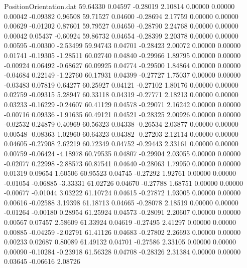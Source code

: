 \begin{filecontents}{PositionOrientation.dat}
  59.64330    0.04597   -0.28019     2.10814    0.00000    0.00000    0.00042   -0.09382    0.96508
  59.71527    0.04600   -0.28694     2.17759    0.00000    0.00000    0.00629   -0.01202    0.87601
  59.79527    0.04650   -0.28790     2.24768    0.00000    0.00000    0.00042    0.05437   -0.60924
  59.86732    0.04654   -0.28399     2.20378    0.00000    0.00000    0.00595   -0.00300   -2.53499
  59.94743    0.04701   -0.28423     2.00072    0.00000    0.00000    0.01741   -0.19305   -1.28511
  60.02740    0.04840   -0.29966     1.89795    0.00000    0.00000   -0.00924    0.06492   -0.68627
  60.09925    0.04774   -0.29500     1.84864    0.00000    0.00000   -0.04684    0.22149   -1.22760
  60.17931    0.04399   -0.27727     1.75037    0.00000    0.00000   -0.03483    0.07819    0.64277
  60.25927    0.04121   -0.27102     1.80176    0.00000    0.00000    0.02759   -0.09315    5.28947
  60.33118    0.04319   -0.27771     2.18213    0.00000    0.00000    0.03233   -0.16229   -0.24607
  60.41129    0.04578   -0.29071     2.16242    0.00000    0.00000   -0.00716    0.09336   -1.91635
  60.49121    0.04521   -0.28325     2.00926    0.00000    0.00000   -0.02532    0.24879    0.40969
  60.56323    0.04338   -0.26534     2.03877    0.00000    0.00000    0.00548   -0.08363    1.02960
  60.64323    0.04382   -0.27203     2.12114    0.00000    0.00000    0.04605   -0.27908    2.62219
  60.72349    0.04752   -0.29443     2.33161    0.00000    0.00000    0.00759   -0.06424   -4.18978
  60.79535    0.04807   -0.29904     2.03055    0.00000    0.00000   -0.02077    0.22998   -2.88573
  60.87541    0.04640   -0.28063     1.79950    0.00000    0.00000    0.01319    0.09654    1.60506
  60.95523    0.04745   -0.27292     1.92761    0.00000    0.00000   -0.01054   -0.06885   -3.33331
  61.02726    0.04670   -0.27788     1.68751    0.00000    0.00000   -0.00677   -0.01044    3.03222
  61.10724    0.04615   -0.27872     1.93005    0.00000    0.00000    0.00616   -0.02588    3.19398
  61.18713    0.04665   -0.28078     2.18519    0.00000    0.00000   -0.01264   -0.00180    0.28954
  61.25924    0.04573   -0.28091     2.20607    0.00000    0.00000    0.00567    0.07457    2.58609
  61.33924    0.04619   -0.27495     2.41297    0.00000    0.00000    0.00885   -0.04259   -2.02791
  61.41126    0.04683   -0.27802     2.26693    0.00000    0.00000    0.00233    0.02687    0.80089
  61.49132    0.04701   -0.27586     2.33105    0.00000    0.00000    0.00090   -0.10284   -0.23918
  61.56328    0.04708   -0.28326     2.31384    0.00000    0.00000    0.03645   -0.06616    2.08726

\end{filecontents}
